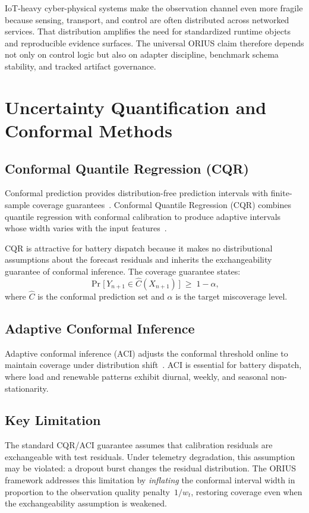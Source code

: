 IoT-heavy cyber-physical systems make the observation channel even more
fragile because sensing, transport, and control are often distributed across
networked services.  That distribution amplifies the need for standardized
runtime objects and reproducible evidence surfaces.  The universal ORIUS
claim therefore depends not only on control logic but also on adapter
discipline, benchmark schema stability, and tracked artifact governance.

\section{Uncertainty Quantification and Conformal Methods}

\subsection{Conformal Quantile Regression (CQR)}

Conformal prediction provides distribution-free prediction intervals with
finite-sample coverage guarantees~\cite{vovk2005algorithmic}.  Conformal
Quantile Regression (CQR) combines quantile regression with conformal
calibration to produce adaptive intervals whose width varies with the
input features~\cite{romano2019conformalized}.

CQR is attractive for battery dispatch because it makes no distributional
assumptions about the forecast residuals and inherits the exchangeability
guarantee of conformal inference.  The coverage guarantee states:
\[
  \Pr\!\bigl[\,Y_{n+1} \in \hat{C}(X_{n+1})\,\bigr]
  \;\ge\; 1 - \alpha,
\]
where $\hat{C}$ is the conformal prediction set and $\alpha$ is the
target miscoverage level.

\subsection{Adaptive Conformal Inference}

Adaptive conformal inference (ACI) adjusts the conformal threshold online
to maintain coverage under distribution shift~\cite{gibbs2021adaptive}.
ACI is essential for battery dispatch, where load and renewable patterns
exhibit diurnal, weekly, and seasonal non-stationarity.

\subsection{Key Limitation}

The standard CQR/ACI guarantee assumes that calibration residuals are
exchangeable with test residuals.  Under telemetry degradation, this
assumption may be violated: a dropout burst changes the residual
distribution.  The ORIUS framework addresses this limitation by
\emph{inflating} the conformal interval width in proportion to the
observation quality penalty~$1/w_t$, restoring coverage even when the
exchangeability assumption is weakened.

